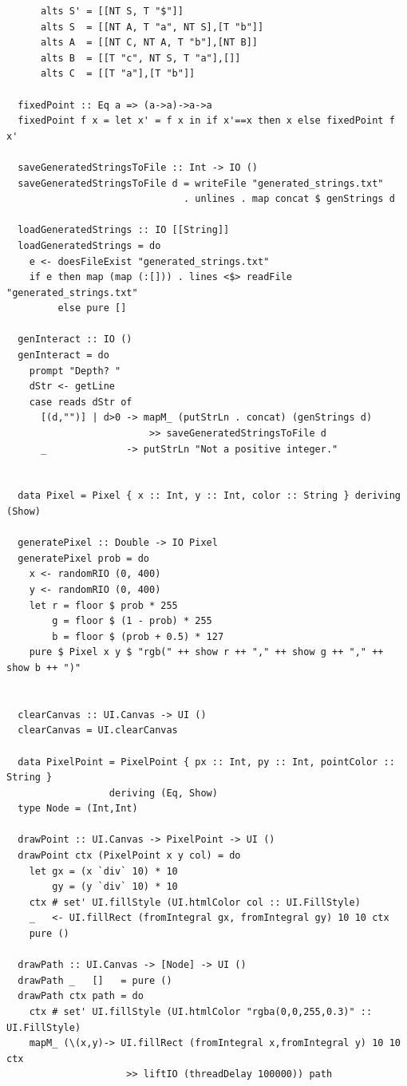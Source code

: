 \documentclass[areasetadvanced]{scrartcl}
\begin{document}
\begin{lstlisting}
      alts S' = [[NT S, T "$"]]
      alts S  = [[NT A, T "a", NT S],[T "b"]]
      alts A  = [[NT C, NT A, T "b"],[NT B]]
      alts B  = [[T "c", NT S, T "a"],[]]
      alts C  = [[T "a"],[T "b"]]
  
  fixedPoint :: Eq a => (a->a)->a->a
  fixedPoint f x = let x' = f x in if x'==x then x else fixedPoint f x'
  
  saveGeneratedStringsToFile :: Int -> IO ()
  saveGeneratedStringsToFile d = writeFile "generated_strings.txt"
                               . unlines . map concat $ genStrings d
  
  loadGeneratedStrings :: IO [[String]]
  loadGeneratedStrings = do
    e <- doesFileExist "generated_strings.txt"
    if e then map (map (:[])) . lines <$> readFile "generated_strings.txt"
         else pure []
  
  genInteract :: IO ()
  genInteract = do
    prompt "Depth? "
    dStr <- getLine
    case reads dStr of
      [(d,"")] | d>0 -> mapM_ (putStrLn . concat) (genStrings d)
                         >> saveGeneratedStringsToFile d
      _              -> putStrLn "Not a positive integer."
  
  
  data Pixel = Pixel { x :: Int, y :: Int, color :: String } deriving (Show)
  
  generatePixel :: Double -> IO Pixel
  generatePixel prob = do
    x <- randomRIO (0, 400)
    y <- randomRIO (0, 400)
    let r = floor $ prob * 255
        g = floor $ (1 - prob) * 255
        b = floor $ (prob + 0.5) * 127
    pure $ Pixel x y $ "rgb(" ++ show r ++ "," ++ show g ++ "," ++ show b ++ ")"
  
  
  clearCanvas :: UI.Canvas -> UI ()
  clearCanvas = UI.clearCanvas
  
  data PixelPoint = PixelPoint { px :: Int, py :: Int, pointColor :: String }
                  deriving (Eq, Show)
  type Node = (Int,Int)
  
  drawPoint :: UI.Canvas -> PixelPoint -> UI ()
  drawPoint ctx (PixelPoint x y col) = do
    let gx = (x `div` 10) * 10
        gy = (y `div` 10) * 10
    ctx # set' UI.fillStyle (UI.htmlColor col :: UI.FillStyle)
    _   <- UI.fillRect (fromIntegral gx, fromIntegral gy) 10 10 ctx
    pure ()
  
  drawPath :: UI.Canvas -> [Node] -> UI ()
  drawPath _   []   = pure ()
  drawPath ctx path = do
    ctx # set' UI.fillStyle (UI.htmlColor "rgba(0,0,255,0.3)" :: UI.FillStyle)
    mapM_ (\(x,y)-> UI.fillRect (fromIntegral x,fromIntegral y) 10 10 ctx
                     >> liftIO (threadDelay 100000)) path
  

\end{lstlisting}
\end{document}
